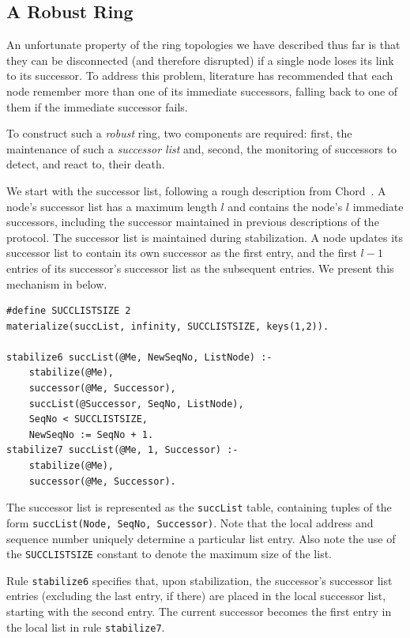\documentclass{article}
\begin{document}
\subsection{A Robust Ring}
\label{sec:robustRing}
An unfortunate property of the ring topologies we have described thus
far is that they can be disconnected (and therefore disrupted) if a
single node loses its link to its successor. To address this problem,
literature has recommended that each node remember more than one of its
immediate successors, falling back to one of them if the immediate
successor fails.

To construct such a \emph{robust} ring, two components are required:
first, the maintenance of such a \emph{successor list} and, second, the
monitoring of successors to detect, and react to, their death.

We start
with the successor list, following a rough description from
Chord~\cite{Stoica2003}. A node's successor list has a maximum length
$l$ and contains the node's $l$ immediate successors, including the
successor maintained in previous descriptions of the protocol. The
successor list is maintained during stabilization. A node updates its
successor list to contain its own successor as the first entry, and the
first $l-1$ entries of its successor's successor list as the subsequent
entries. We present this mechanism in \ol below.
\begin{lstlisting}
#define SUCCLISTSIZE 2
materialize(succList, infinity, SUCCLISTSIZE, keys(1,2)).

stabilize6 succList(@Me, NewSeqNo, ListNode) :-
	stabilize(@Me),
	successor(@Me, Successor),
	succList(@Successor, SeqNo, ListNode),
	SeqNo < SUCCLISTSIZE,
	NewSeqNo := SeqNo + 1.
stabilize7 succList(@Me, 1, Successor) :-
	stabilize(@Me),
	successor(@Me, Successor).
\end{lstlisting}
The successor list is represented as the \lstinline$succList$ table,
containing tuples of the form \lstinline$succList(Node, SeqNo, Successor)$.
Note that the local address and sequence number uniquely
determine a particular list entry. Also note the use of the
\texttt{SUCCLISTSIZE} constant to denote the maximum size of the list.

Rule \lstinline$stabilize6$ specifies that, upon stabilization, the
successor's successor list entries (excluding the last entry, if there)
are placed in the local successor list, starting with the second entry.
The current successor becomes the first entry in the local list in rule
\lstinline$stabilize7$.
\end{document}
